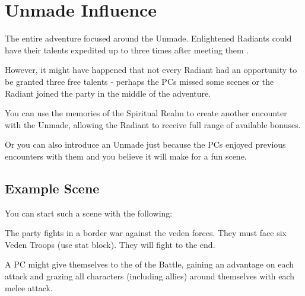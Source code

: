 \section{Unmade Influence}
\label{sec:unmadeProgression}

The entire adventure focused around the Unmade. Enlightened Radiants could have their talents expedited up to three times after meeting them \seeCorruptedRules{}.

However, it might have happened that not every Radiant had an opportunity to be granted three free talents - perhaps the PCs missed some scenes or the Radiant joined the party in the middle of the adventure.

You can use the memories of the Spiritual Realm to create another encounter with the Unmade, allowing the Radiant to receive full range of available bonuses.

Or you can also introduce an Unmade just because the PCs enjoyed previous encounters with them and you believe it will make for a fun scene.




\subsection{Example Scene}

You can start such a scene with the following:


The party fights in a border war against the veden forces. They must face six Veden Troops (use \enemyQueensGuard{} stat block). They will fight to the end.

A PC might give themselves to the \npcThrillTitle{} of the Battle, gaining an advantage on each attack and grazing all characters (including allies) around themselves with each melee attack.


